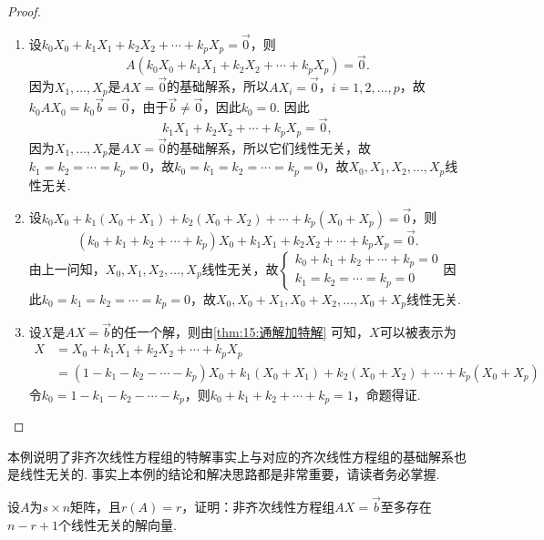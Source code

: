 \begin{proof}
    \begin{enumerate}
        \item 设$k_0X_0+k_1X_1+k_2X_2+\cdots+k_pX_p=\vec{0}$，则
              \[A(k_0X_0+k_1X_1+k_2X_2+\cdots+k_pX_p)=\vec{0}.\]
              因为$X_1,\ldots,X_p$是$AX=\vec{0}$的基础解系，所以$AX_i=\vec{0}$，$i=1,2,\ldots,p$，故$k_0AX_0=k_0\vec{b}=\vec{0}$，由于$\vec{b}\neq \vec{0}$，因此$k_0=0$. 因此
              \[k_1X_1+k_2X_2+\cdots+k_pX_p=\vec{0},\]
              因为$X_1,\ldots,X_p$是$AX=\vec{0}$的基础解系，所以它们线性无关，故$k_1=k_2=\cdots=k_p=0$，故$k_0=k_1=k_2=\cdots=k_p=0$，故$X_0,X_1,X_2,\ldots,X_p$线性无关.

        \item 设$k_0X_0+k_1(X_0+X_1)+k_2(X_0+X_2)+\cdots+k_p(X_0+X_p)=\vec{0}$，则
              \[(k_0+k_1+k_2+\cdots+k_p)X_0+k_1X_1+k_2X_2+\cdots+k_pX_p=\vec{0}.\]
              由上一问知，$X_0,X_1,X_2,\ldots,X_p$线性无关，故$\begin{cases}
                      k_0+k_1+k_2+\cdots+k_p=0 \\
                      k_1=k_2=\cdots=k_p=0
                  \end{cases}$因此$k_0=k_1=k_2=\cdots=k_p=0$，故$X_0,X_0+X_1,X_0+X_2,\ldots,X_0+X_p$线性无关.

        \item 设$X$是$AX=\vec{b}$的任一个解，则由\autoref{thm:15:通解加特解} 可知，$X$可以被表示为
              \begin{align*}
                  X & =X_0+k_1X_1+k_2X_2+\cdots+k_pX_p                                         \\
                    & =(1-k_1-k_2-\cdots-k_p)X_0+k_1(X_0+X_1)+k_2(X_0+X_2)+\cdots+k_p(X_0+X_p)
              \end{align*}
              令$k_0=1-k_1-k_2-\cdots-k_p$，则$k_0+k_1+k_2+\cdots+k_p=1$，命题得证.
    \end{enumerate}
\end{proof}

本例说明了非齐次线性方程组的特解事实上与对应的齐次线性方程组的基础解系也是线性无关的. 事实上本例的结论和解决思路都是非常重要，请读者务必掌握.

\begin{example}\label{ex:15:非齐次线性无关解}
    设$A$为$s \times n$矩阵，且$r(A)=r$，证明：非齐次线性方程组$AX=\vec{b}$至多存在$n-r+1$个线性无关的解向量.
\end{example}

